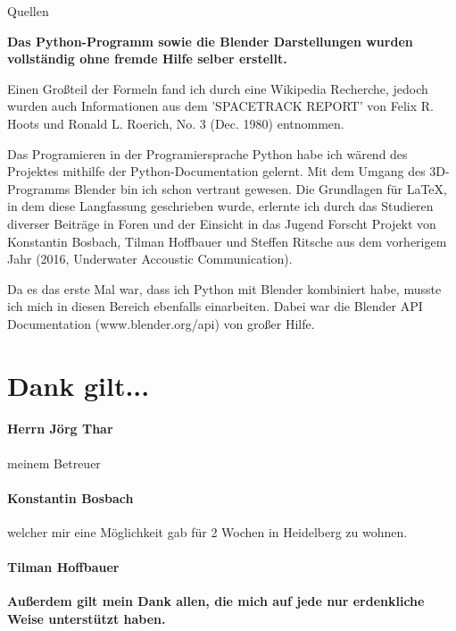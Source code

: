 Quellen

\begin{center}
 \textbf{
  Das Python-Programm sowie die Blender Darstellungen wurden vollständig ohne fremde Hilfe selber erstellt.
 }
\end{center}
\par Einen Großteil der Formeln fand ich durch eine Wikipedia Recherche, jedoch wurden auch Informationen aus dem 'SPACETRACK REPORT' von Felix R. Hoots und Ronald L. Roerich,
No. 3 (Dec. 1980) entnommen.
\par Das Programieren in der Programiersprache Python habe ich wärend des Projektes mithilfe der Python-Documentation gelernt. Mit dem Umgang des 3D-Programms Blender
bin ich schon vertraut gewesen. Die Grundlagen für \LaTeX, in dem diese Langfassung geschrieben wurde, erlernte ich durch das Studieren diverser Beiträge in Foren und der Einsicht
in das Jugend Forscht Projekt von Konstantin Bosbach, Tilman Hoffbauer und Steffen Ritsche aus dem vorherigem Jahr (2016, Underwater Accoustic Communication).
\par Da es das erste Mal war, dass ich Python mit Blender kombiniert habe, musste ich mich in diesen Bereich ebenfalls einarbeiten.
Dabei war die Blender API Documentation (www.blender.org/api) von großer Hilfe.


\raggedleft
\section*{Dank gilt...}
\paragraph{Herrn Jörg Thar} meinem Betreuer
\paragraph{Konstantin Bosbach} welcher mir eine Möglichkeit gab für 2 Wochen in Heidelberg zu wohnen.
\paragraph{Tilman Hoffbauer}

\centering
\vspace{0.5cm} \textbf{Außerdem gilt mein Dank allen, die mich auf jede nur erdenkliche Weise unterstützt haben.}
